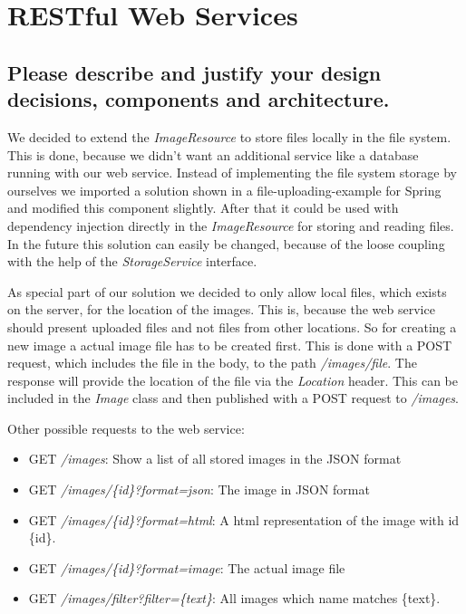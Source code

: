 
\section{RESTful Web Services}
\subsection{Please describe and justify your design decisions, components and
architecture.}

We decided to extend the \textit{ImageResource} to store files locally in the file system. This is done, because we didn't want an additional service like a database running with our web service. Instead of implementing the file system storage by ourselves we imported a solution shown in a file-uploading-example for Spring and modified this component slightly. After that it could be used with dependency injection directly in the \textit{ImageResource} for storing and reading files. In the future this solution can easily be changed, because of the loose coupling with the help of the \textit{StorageService} interface.

As special part of our solution we decided to only allow local files, which exists on the server, for the location of the images. This is, because the web service should present uploaded files and not files from other locations. So for creating a new image a actual image file has to be created first. This is done with a POST request, which includes the file in the body, to the path \textit{/images/file}. The response will provide the location of the file via the \textit{Location} header. This can be included in the \textit{Image} class and then published with a POST request to \textit{/images}.

Other possible requests to the web service:
\begin{itemize}
    \item GET \textit{/images}: Show a list of all stored images in the JSON format
    \item GET \textit{/images/\{id\}?format=json}: The image in JSON format
    \item GET \textit{/images/\{id\}?format=html}: A html representation of the image with id \{id\}.
    \item GET \textit{/images/\{id\}?format=image}: The actual image file
    \item GET \textit{/images/filter?filter=\{text\}}: All images which name matches \{text\}.
\end{itemize}